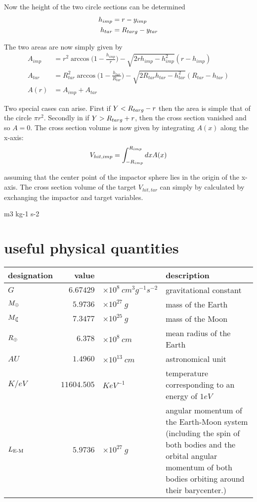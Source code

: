 Now the height of the two circle sections can be determined
\begin{align}
\label{ch07_sec01_eq003}
h_{imp} &= r - y_{imp}\\
h_{tar} &= R_{targ} - y_{tar} 
\end{align}

The two areas are now simply given by
\begin{align}
\label{ch07_sec01_eq004}
A_{imp} &= r^2 \arccos{\Big( 1 - \frac{h_{imp}}{r} \Big) } - \sqrt{2 r h_{imp} - h_{imp}^2} (r - h_{imp} )  \\
A_{tar} &= R_{tar}^2 \arccos{\Big(1 - \frac{h_{tar}}{R_{tar}} \Big)  } - \sqrt{2 R_{tar} h_{tar} - h_{tar}^2} (R_{tar} - h_{tar} )  \\
A(r) &= A_{imp} + A_{tar}
\end{align}

Two special cases can arise. First if $Y < R_{targ} - r $ then the area is simple that of the circle $\pi r^2$. Secondly in if $Y > R_{targ} + r$, then the cross section vanished and so $A = 0$. The cross section volume is now given by integrating $A(x)$ along the x-axis:
\begin{align}
\label{ch07_sec01_eq002}
V_{hit, imp} = \int_{-R_{imp}}^{R_{imp}} dx A(x)
\end{align}

assuming that the center point of the impactor sphere lies in the origin of the x-axis. The cross section volume of the target $V_{hit, tar}$ can simply by calculated by exchanging the impactor and target variables. 

m3 kg-1 s-2
\clearpage

\section{useful physical quantities}

\begin{tabular}{l r l p{8.0cm}}
designation & value & & description \\ \hline
$ G $ &  $6.67429$ & $ \times 10^{8} ~cm^3 g^{-1} s^{-2} $ & gravitational constant \\ 
$ M_{\oplus} $ & $ 5.9736$ & $\times 10^{27} ~g$ & mass of the Earth \\
$ \ML $ & $ 7.3477$ & $\times 10^{25} ~g$ & mass of the Moon \\
$ R_{\oplus} $ & $ 6.378 $ & $\times 10^8 ~cm$ & mean radius of the Earth \\
$ AU $ & $ 1.4960 $ & $\times 10^{13} ~cm$ & astronomical unit \\
$ K / eV $ & $ 11604.505 $ & $K eV^{-1}$ & temperature corresponding to an energy of $1 eV$ \\
$ L_{\textrm{E-M}} $ & $ 5.9736 $ & $\times 10^{27}~ g$ & angular momentum of the Earth-Moon system (including the spin of both bodies and the orbital angular momentum of both bodies orbiting around their barycenter.)\\
\end{tabular}






